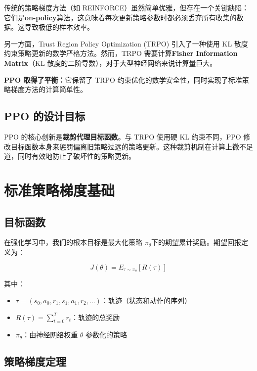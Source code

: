 \documentclass[12pt,a4paper]{article}
\theoremstyle{noteplain}
\theoremstyle{noteexercise}
\begin{document}
传统的策略梯度方法（如 REINFORCE）虽然简单优雅，但存在一个关键缺陷：它们是\textbf{on-policy}算法，这意味着每次更新策略参数时都必须丢弃所有收集的数据。这导致极低的样本效率。

另一方面，Trust Region Policy Optimization (TRPO) 引入了一种使用 KL 散度约束策略更新的数学严格方法。然而，TRPO 需要计算\textbf{Fisher Information Matrix}（KL 散度的二阶导数），对于大型神经网络来说计算量巨大。

\textbf{PPO 取得了平衡：}它保留了 TRPO 约束优化的数学安全性，同时实现了标准策略梯度方法的计算简单性。

\subsection{PPO 的设计目标}

PPO 的核心创新是\textbf{裁剪代理目标函数}。与 TRPO 使用硬 KL 约束不同，PPO 修改目标函数本身来惩罚偏离旧策略过远的策略更新。这种裁剪机制在计算上微不足道，同时有效地防止了破坏性的策略更新。

\section{标准策略梯度基础}\label{sec:pg-foundation}

\subsection{目标函数}

在强化学习中，我们的根本目标是最大化策略 $\pi_\theta$下的期望累计奖励。期望回报定义为：

\begin{equation}\label{eq:expected-return}
  J(\theta) = E_{\tau \sim \pi_\theta}[R(\tau)]
\end{equation}

其中：
\begin{itemize}
  \setlength{\itemsep}{0.2em}
  \item $\tau = (s_0, a_0, r_1, s_1, a_1, r_2, \ldots)$：轨迹（状态和动作的序列）
  \item $R(\tau) = \sum_{t=0}^{T} r_t$：轨迹的总奖励
  \item $\pi_\theta$：由神经网络权重 $\theta$ 参数化的策略
\end{itemize}

\subsection{策略梯度定理}
\end{document}
